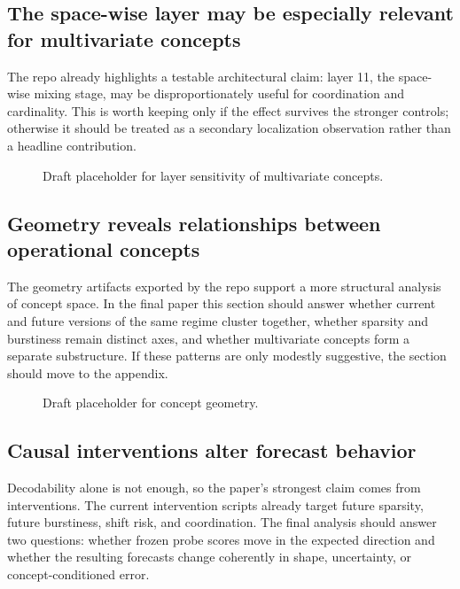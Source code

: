 \documentclass{article}
\begin{document}
\subsection{The space-wise layer may be especially relevant for multivariate concepts}

The repo already highlights a testable architectural claim: layer 11, the space-wise mixing stage, may be disproportionately useful for coordination and cardinality. This is worth keeping only if the effect survives the stronger controls; otherwise it should be treated as a secondary localization observation rather than a headline contribution.

\begin{figure}[t]
\centering
{}
\caption{Draft placeholder for layer sensitivity of multivariate concepts.}
\label{fig:layer11}
\end{figure}

\subsection{Geometry reveals relationships between operational concepts}

The geometry artifacts exported by the repo support a more structural analysis of concept space. In the final paper this section should answer whether current and future versions of the same regime cluster together, whether sparsity and burstiness remain distinct axes, and whether multivariate concepts form a separate substructure. If these patterns are only modestly suggestive, the section should move to the appendix.

\begin{figure}[t]
\centering
{}
\caption{Draft placeholder for concept geometry.}
\label{fig:geometry}
\end{figure}

\subsection{Causal interventions alter forecast behavior}

Decodability alone is not enough, so the paper's strongest claim comes from interventions. The current intervention scripts already target future sparsity, future burstiness, shift risk, and coordination. The final analysis should answer two questions: whether frozen probe scores move in the expected direction and whether the resulting forecasts change coherently in shape, uncertainty, or concept-conditioned error.
\end{document}
